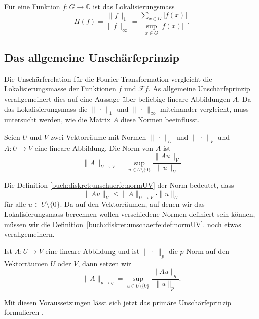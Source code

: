 \begin{definition}
\label{buch:diskret:unschaerfe:def:lokalisierungsmass}
Für eine Funktion $f\colon G\to\mathbb{C}$ ist das Lokalisierungsmass
\[
H(f)
=
\frac{\|f\|_1}{\|f\|_\infty}
=
\frac{\displaystyle\sum_{x\in G} |f(x)|}{\displaystyle\sup_{x\in G} |f(x)|}.
\]
\end{definition}

%
%
\subsection{Das allgemeine Unschärfeprinzip}
Die Unschärferelation für die Fourier-Transformation vergleicht
die Lokalisierungsmasse der Funktionen $f$ und $\mathscr{F}f$.
As allgemeine Unschärfeprinzip verallgemeinert dies auf eine
Aussage über beliebige lineare Abbildungen $A$.
Da das Lokalisierungsmass die $\|\,\cdot\,\|_1$ und $\|\,\cdot\,\|_\infty$
miteinander vergleicht, muss untersucht werden, wie die Matrix $A$
diese Normen beeinflusst.

\begin{definition}
\label{buch:diskret:unschaerfe:def:normUV}
Seien $U$ und $V$ zwei Vektorräume mit Normen $\|\,\cdot\,\|_U$ und
$\|\,\cdot\,\|_V$ und $A\colon U\to V$ eine lineare Abbildung.
Die Norm von $A$ ist
\begin{equation}
\|A\|_{U\to V}
=
\sup_{u\in U\setminus\{0\}} \frac{\| Au\|_V}{\|u\|_U}
\label{buch:diskret:unschaerfe:normUV}
\end{equation}
\end{definition}

Die Definition
\eqref{buch:diskret:unschaerfe:normUV}
der Norm bedeutet, dass
\[
\|Au\|_V \le \|A\|_{U\to V}\cdot \|u\|_U
\]
für alle $u\in U\setminus\{0\}$.
Da auf den Vektorräumen, auf denen wir das Lokalisierungsmass
berechnen wollen verschiedene Normen definiert sein können,
müssen wir die Definition~\ref{buch:diskret:unschaerfe:def:normUV}.
noch etwas verallgemeinern.

\begin{definition}
\label{buch:diskret:unschaerfe:def:norm1i}
Ist $A\colon U\to V$ eine lineare Abbildung und ist $\|\,\cdot\,\|_p$
die $p$-Norm auf den Vektorräumen $U$ oder $V$, dann setzen wir
\[
\|A\|_{p\to q}
=
\sup_{u\in U\setminus\{0\}}
\frac{\|Au\|_q}{\|u\|_p}.
\]
\end{definition}

Mit diesen Voraussetzungen lässt sich jetzt das primäre Unschärfeprinzip
formulieren \cite{buch:widgerson}.

